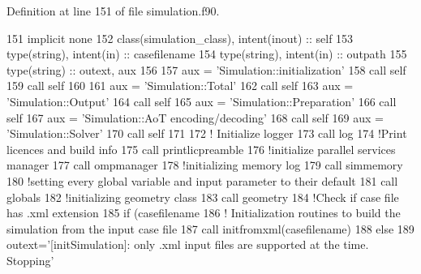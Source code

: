 Definition at line 151 of file simulation.\+f90.


\begin{DoxyCode}
151     \textcolor{keywordtype}{implicit none}
152     \textcolor{keywordtype}{class}(simulation\_class), \textcolor{keywordtype}{intent(inout)} :: self
153     \textcolor{keywordtype}{type}(string), \textcolor{keywordtype}{intent(in)} :: casefilename
154     \textcolor{keywordtype}{type}(string), \textcolor{keywordtype}{intent(in)} :: outpath
155     \textcolor{keywordtype}{type}(string) :: outext, aux
156 
157     aux = \textcolor{stringliteral}{'Simulation::initialization'}
158     \textcolor{keyword}{call }self%
159     \textcolor{keyword}{call }self%
160 
161     aux = \textcolor{stringliteral}{'Simulation::Total'}
162     \textcolor{keyword}{call }self%
163     aux = \textcolor{stringliteral}{'Simulation::Output'}
164     \textcolor{keyword}{call }self%
165     aux = \textcolor{stringliteral}{'Simulation::Preparation'}
166     \textcolor{keyword}{call }self%
167     aux = \textcolor{stringliteral}{'Simulation::AoT encoding/decoding'}
168     \textcolor{keyword}{call }self%
169     aux = \textcolor{stringliteral}{'Simulation::Solver'}
170     \textcolor{keyword}{call }self%
171 
172     \textcolor{comment}{! Initialize logger}
173     \textcolor{keyword}{call }log%
174     \textcolor{comment}{!Print licences and build info}
175     \textcolor{keyword}{call }printlicpreamble
176     \textcolor{comment}{!initialize parallel services manager}
177     \textcolor{keyword}{call }ompmanager%
178     \textcolor{comment}{!initializing memory log}
179     \textcolor{keyword}{call }simmemory%
180     \textcolor{comment}{!setting every global variable and input parameter to their default}
181     \textcolor{keyword}{call }globals%
182     \textcolor{comment}{!initializing geometry class}
183     \textcolor{keyword}{call }geometry%
184     \textcolor{comment}{!Check if case file has .xml extension}
185     \textcolor{keywordflow}{if} (casefilename%
186         \textcolor{comment}{! Initialization routines to build the simulation from the input case file}
187         \textcolor{keyword}{call }initfromxml(casefilename)
188     \textcolor{keywordflow}{else}
189         outext=\textcolor{stringliteral}{'[initSimulation]: only .xml input files are supported at the time. Stopping'}

\end{DoxyCode}

